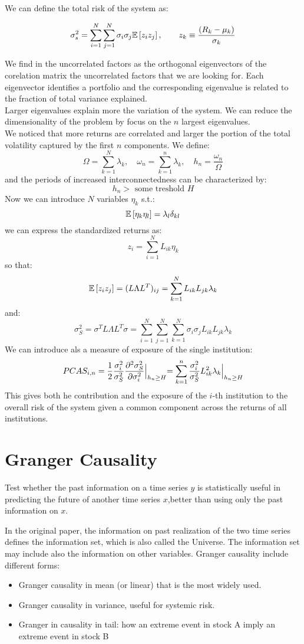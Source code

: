 We can define the total risk of the system as:
\begin{mydefinition}
	\[
	\sigma^2_s = \sum_{i=1}^{N} \sum_{j=1}^{N} \sigma_i \sigma_j \mathbb{E}\left[z_iz_j\right], \qquad z_k \equiv \frac{(R_k - \mu_k)}{\sigma_k}
	\]
\end{mydefinition}
We find in the uncorrelated factors as the orthogonal eigenvectors of the corelation matrix  the uncorrelated factors that we are looking for. Each eigenvector identifies a portfolio and the corresponding eigenvalue is related to the fraction of total variance explained.\\
Larger eigenvalues explain more the variation of the system. We can reduce the dimensionality of the problem by focus on the $n$ largest eigenvalues.\\
We noticed that more returns are correlated and larger the portion of the total volatility captured by the first $n$ components.
We define:
\[
\Omega = \sum_{k=1}^{N} \lambda_k, \quad \omega_n = \sum_{k=1}^{n} \lambda_k, \quad h_n = \frac{\omega_n}{\Omega}
\]
and the periods of increased interconnectedness can be characterized by:
\[
h_n > \text{ some treshold } H 
\]
Now we can introduce $N$ variables $\eta_k$ s.t.:
\[
\mathbb{E}\left[\eta_k \eta_l\right] = \lambda_l \delta_{kl}
\]
we can express the standardized returns as:
\[
z_i = \sum_{i=1}^{N} L_{ik} \eta_k
\]
so that:
\[
\mathbb{E}\left[z_iz_j\right] = (L\Lambda L^T)_{ij} = \sum_{k=1}^{N} L_{ik} L_{jk} \lambda_k
\]
and:
\[
\sigma^2_S = \sigma^T L \Lambda L^T \sigma = \sum_{i=1}^{N}\sum_{j=1}^{N}\sum_{k=1}^{N} \sigma_i \sigma_j L_{ik}L_{jk}\lambda_k
\]
We can introduce als a measure of exposure of the single institution:
\[
PCAS_{i,n} = \frac{1}{2}\frac{\sigma_i^2}{\sigma_S^2} \frac{\partial^2 \sigma^2_S}{\partial \sigma_i^2}\Bigl|_{h_n \geq H} = \sum_{k =1}^{n} \frac{\sigma_i^2}{\sigma^2_S}L^2_{ik}\lambda_k\Bigl|_{h_n \geq H}
\]
This gives both he contribution and the exposure of the $i$-th institution to the overall risk of the system given a common component across the returns of all institutions.
\section{Granger Causality}
\begin{mydefinition}
	Test whether the past information on a time series $y$ is statistically useful in predicting the future of another time series $x$,better than using only the past information on $x$.
\end{mydefinition}
In the original paper, the information on past realization of the two time series defines the information set, which is also called the Universe. The information set may include also the information on other variables. Granger causality include different forms:
\begin{itemize}
	\item Granger causality in mean (or linear) that is the most widely used.
	\item Granger causality in variance, useful for systemic risk.
	\item Granger in causality in tail: how an extreme event in stock A imply an extreme event in stock B
\end{itemize}

